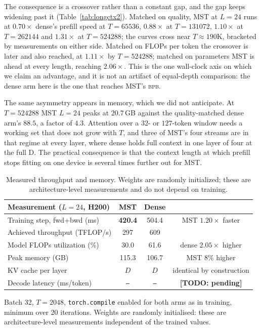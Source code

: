 \documentclass{article}
\newcommand{\TODO}[1]{{\color{red}\textbf{[TODO: #1]}}}
\newcommand{\PH}{{\color{red}\texttt{--}}}   %
\newcommand{\bpb}{\textsc{bpb}}
\newcommand{\dmodel}{D}
\begin{document}
The consequence is a crossover rather than a constant gap, and the gap keeps
widening past it (Table~\ref{tab:longctx2}). Matched on quality, MST at $L{=}24$
runs at $0.70\times$ dense's prefill speed at $T{=}65536$, $0.88\times$ at
$T{=}131072$, $1.10\times$ at $T{=}262144$ and $\mathbf{1.31\times}$ at
$T{=}524288$; the curves cross near $T{\approx}190$K, bracketed by measurements on
either side. Matched on FLOPs per token the crossover is later and also reached,
at $1.11\times$ by $T{=}524288$; matched on parameters MST is ahead at every
length, reaching $2.06\times$. This is the one wall-clock axis on which we claim
an advantage, and it is not an artifact of equal-depth comparison: the dense arm
here is the one that reaches MST's \bpb.

The same asymmetry appears in memory, which we did not anticipate. At
$T{=}524288$ MST $L{=}24$ peaks at $20.7$\,GB against the quality-matched dense
arm's $88.5$, a factor of $4.3$. Attention over a $32$- or $127$-token window
needs a working set that does not grow with $T$, and three of MST's four streams
are in that regime at every layer, where dense holds full context in one layer of
four at the full \dmodel. The practical consequence is that the context length at
which prefill stops fitting on one device is several times further out for MST.

\begin{table}[t]
\caption{Measured throughput and memory. Weights are randomly initialized;
these are architecture-level measurements and do not depend on training.}
\label{tab:speed}
\begin{center}
\begin{small}
\begin{tabular}{lccc}
\toprule
Measurement ($L{=}24$, H200) & MST & Dense & \\
\midrule
Training step, fwd+bwd (ms)     & \textbf{420.4} & 504.4 & MST $1.20\times$ faster \\
Achieved throughput (TFLOP/s)   & 297 & 609 & \\
Model FLOPs utilization (\%)    & 30.0 & 61.6 & dense $2.05\times$ higher \\
Peak memory (GB)                & 115.3 & 106.7 & MST $8\%$ higher \\
KV cache per layer              & $\dmodel$ & $\dmodel$ & identical by construction \\
\midrule
Decode latency (ms/token)       & \PH & \PH & \TODO{pending} \\
\bottomrule
\end{tabular}
\end{small}
\end{center}
Batch 32, $T{=}2048$, \texttt{torch.compile} enabled for both arms as in
training, minimum over 20 iterations. Weights are randomly initialised: these are
architecture-level measurements independent of the trained values.
\end{table}
\end{document}
